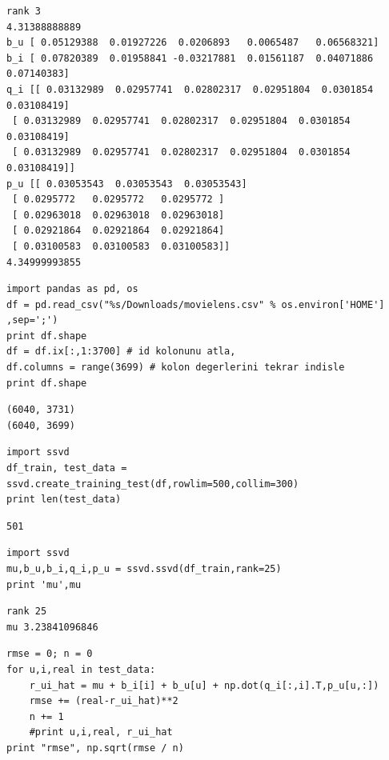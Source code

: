 \documentclass[12pt,fleqn]{article}\usepackage{../common}
\begin{document}
\begin{verbatim}
rank 3
4.31388888889
b_u [ 0.05129388  0.01927226  0.0206893   0.0065487   0.06568321]
b_i [ 0.07820389  0.01958841 -0.03217881  0.01561187  0.04071886  0.07140383]
q_i [[ 0.03132989  0.02957741  0.02802317  0.02951804  0.0301854   0.03108419]
 [ 0.03132989  0.02957741  0.02802317  0.02951804  0.0301854   0.03108419]
 [ 0.03132989  0.02957741  0.02802317  0.02951804  0.0301854   0.03108419]]
p_u [[ 0.03053543  0.03053543  0.03053543]
 [ 0.0295772   0.0295772   0.0295772 ]
 [ 0.02963018  0.02963018  0.02963018]
 [ 0.02921864  0.02921864  0.02921864]
 [ 0.03100583  0.03100583  0.03100583]]
4.34999993855
\end{verbatim}


\begin{verbatim}
import pandas as pd, os
df = pd.read_csv("%s/Downloads/movielens.csv" % os.environ['HOME'] ,sep=';')
print df.shape
df = df.ix[:,1:3700] # id kolonunu atla,
df.columns = range(3699) # kolon degerlerini tekrar indisle
print df.shape
\end{verbatim}

\begin{verbatim}
(6040, 3731)
(6040, 3699)
\end{verbatim}

\begin{verbatim}
import ssvd
df_train, test_data = ssvd.create_training_test(df,rowlim=500,collim=300)
print len(test_data)
\end{verbatim}

\begin{verbatim}
501
\end{verbatim}


\begin{verbatim}
import ssvd
mu,b_u,b_i,q_i,p_u = ssvd.ssvd(df_train,rank=25)
print 'mu',mu
\end{verbatim}

\begin{verbatim}
rank 25
mu 3.23841096846
\end{verbatim}


\begin{verbatim}
rmse = 0; n = 0
for u,i,real in test_data:
    r_ui_hat = mu + b_i[i] + b_u[u] + np.dot(q_i[:,i].T,p_u[u,:])
    rmse += (real-r_ui_hat)**2
    n += 1
    #print u,i,real, r_ui_hat
print "rmse", np.sqrt(rmse / n)
\end{verbatim}
\end{document}
